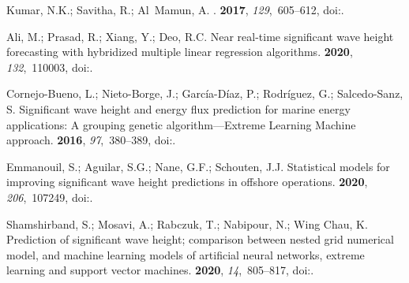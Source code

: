 \documentclass[energies,article,accept,moreauthors,pdftex]{Definitions/mdpi}
\begin{document}
\begin{thebibliography}{999}
Kumar, N.K.; Savitha, R.; Al~Mamun, A.
.
 {\bf 2017}, {\em 129},~605--612, 
\newblock
  doi:{\href{https://doi.org/10.1016/j.oceaneng.2016.10.033}{}}.

Ali, M.; Prasad, R.; Xiang, Y.; Deo, R.C.
\newblock Near real-time significant wave height forecasting with hybridized
  multiple linear regression algorithms.
 {\bf 2020}, {\em
  132},~110003, 
\newblock
  doi:{\href{https://doi.org/doi.org/10.1016/j.rser.2020.110003}{}}.

Cornejo-Bueno, L.; Nieto-Borge, J.; García-Díaz, P.; Rodríguez, G.;
  Salcedo-Sanz, S.
\newblock Significant wave height and energy flux prediction for marine energy
  applications: A grouping genetic algorithm---Extreme Learning Machine
  approach.
 {\bf 2016}, {\em 97},~380--389, 
\newblock
  doi:{\href{https://doi.org/doi.org/10.1016/j.renene.2016.05.094}{}}.

Emmanouil, S.; Aguilar, S.G.; Nane, G.F.; Schouten, J.J.
\newblock Statistical models for improving significant wave height predictions
  in offshore operations.
 {\bf 2020}, {\em 206},~107249, 
\newblock
  doi:{\href{https://doi.org/doi.org/10.1016/j.oceaneng.2020.107249}{}}.

Shamshirband, S.; Mosavi, A.; Rabczuk, T.; Nabipour, N.; Wing Chau, K.
\newblock Prediction of significant wave height; comparison between nested grid
  numerical model, and machine learning models of artificial neural networks,
  extreme learning and support vector machines.
 {\bf
  2020}, {\em 14},~805--817, 
\newblock
  doi:{\href{https://doi.org/10.1080/19942060.2020.1773932}{}}.


\end{thebibliography}
\end{document}
